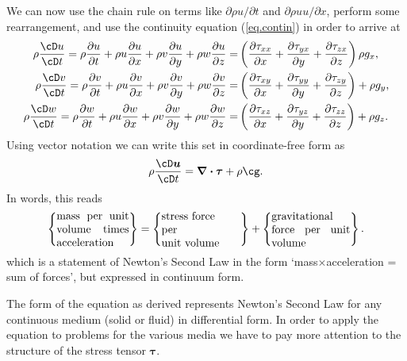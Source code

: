 \documentclass[a4paper,11pt]		{report}
\begin{document}
We can now use the chain rule on terms like $\partial \rho u/\partial
t$ and $\partial \rho u u/\partial x$, perform some rearrangement, and
use the continuity equation (\ref{eq.contin}) in order to arrive at
\begin{align}
\rho\frac{\cD u}{\cD t}=\rho\frac{\partial u}{\partial t} + 
\rho u\frac{\partial u}{\partial x} +
\rho v\frac{\partial u}{\partial y} +
\rho w\frac{\partial u}{\partial z} =&
\left(
\frac{\partial \tau_{xx}}{\partial x} +
\frac{\partial \tau_{yx}}{\partial y} +
\frac{\partial \tau_{zx}}{\partial z}
\right)
\rho g_x,\\
\rho\frac{\cD v}{\cD t}=\rho\frac{\partial v}{\partial t} + 
\rho u\frac{\partial v}{\partial x} +
\rho v\frac{\partial v}{\partial y} +
\rho w\frac{\partial v}{\partial z} =&
\left(
\frac{\partial \tau_{xy}}{\partial x} +
\frac{\partial \tau_{yy}}{\partial y} +
\frac{\partial \tau_{zy}}{\partial z}
\right)
+\rho g_y,\\
\rho\frac{\cD w}{\cD t}=\rho\frac{\partial w}{\partial t} + 
\rho u\frac{\partial w}{\partial x} +
\rho v\frac{\partial w}{\partial y} +
\rho w\frac{\partial w}{\partial z} =&
\left(
\frac{\partial \tau_{xz}}{\partial x} +
\frac{\partial \tau_{yz}}{\partial y} +
\frac{\partial \tau_{zz}}{\partial z}
\right)
+\rho g_z.
\end{align}
Using vector notation we can write this set in coordinate-free form as
\begin{equation}
\rho\frac{\cD\bm{u}}{\cD t}=%
\bm{\nabla\cdot\tau} + \rho\bm{\cg}.
\label{eq.momvec}
\end{equation}
In words, this reads
\begin{equation}
\left\{ \parbox{23mm}{mass per unit volume times acceleration} \right\}=
\left\{ \parbox{25mm}{%
                      stress force \\
                      per\\ unit volume} \right\} +
\left\{ \parbox{25mm}{gravitational force per unit volume} \right\}.
\label{eq.newt2_words}
\end{equation}
which is a statement of Newton's Second Law in the form
`mass$\times$acceleration = sum of forces', but expressed in continuum
form.

The form of the equation as derived represents Newton's Second Law for
any continuous medium (solid or fluid) in differential form. In order
to apply the equation to problems for the various media we have to pay
more attention to the structure of the stress tensor $\bm{\tau}$.
\end{document}
